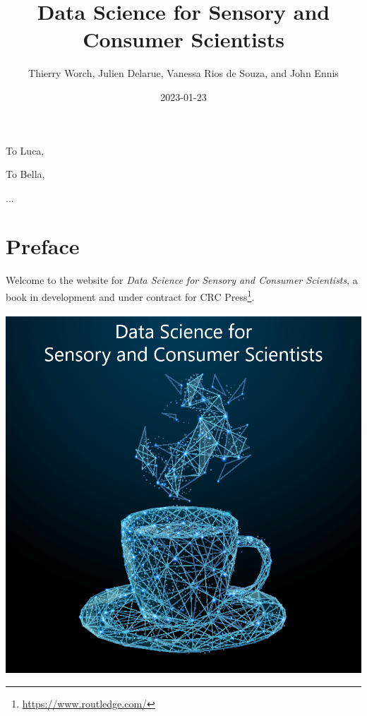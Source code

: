 \documentclass[
]{krantz}
\title{Data Science for Sensory and Consumer Scientists}
\author{Thierry Worch, Julien Delarue, Vanessa Rios de Souza, and John Ennis}
\date{2023-01-23}
\renewcommand{\href}[2]{#2\footnote{\url{#1}}}
\begin{document}
\maketitle


\thispagestyle{empty}

\begin{center}
To Luca,

To Bella,

...
\end{center}

\setlength{\abovedisplayskip}{-5pt}
\setlength{\abovedisplayshortskip}{-5pt}

{
\hypersetup{linkcolor=}
\setcounter{tocdepth}{2}
\tableofcontents
}
\hypertarget{preface}{%
\chapter*{Preface}\label{preface}}


Welcome to the website for \emph{Data Science for Sensory and Consumer Scientists}, a book in development and under contract for \href{https://www.routledge.com/}{CRC Press}.

\includegraphics[width=0.9\linewidth]{images/cover_art}
\end{document}
